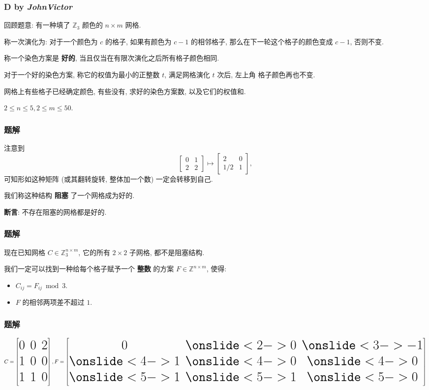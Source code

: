 \frame
{
    \frametitle{D {\Dname} {by \itshape JohnVictor}}

    回顾题意: 有一种填了 $\mathbb Z_3$ 颜色的 $n\times m$ 网格.

    称一次演化为: 对于一个颜色为 $c$ 的格子, 如果有颜色为 $c-1$ 的相邻格子,
    那么在下一轮这个格子的颜色变成 $c-1$, 否则不变.

    称一个染色方案是 \textbf{好的}, 当且仅当在有限次演化之后所有格子颜色相同.

    对于一个好的染色方案, 称它的权值为最小的正整数 $t$, 满足网格演化 $t$ 次后, 左上角
    格子颜色再也不变.

    网格上有些格子已经确定颜色, 有些没有, 求好的染色方案数, 以及它们的权值和.

    $2\leq n\leq 5, 2\leq m\leq 50$.
}

\frame
{
    \frametitle{题解}

    注意到
    \[ \begin{bmatrix}
        0 & 1\\
        2 & 2
    \end{bmatrix} \mapsto \begin{bmatrix}
        2 & 0\\
        1/2 & 1
    \end{bmatrix}, \]
    可知形如这种矩阵 (或其翻转旋转, 整体加一个数) 一定会转移到自己.

    \pause

    我们称这种结构 \textbf{阻塞} 了一个网格成为好的.

    \pause

    \textbf{断言}: 不存在阻塞的网格都是好的.
}

\frame
{
    \frametitle{题解}

    现在已知网格 $C\in \mathbb Z_3^{n\times m}$, 它的所有 $2\times 2$ 子网格, 都不是阻塞结构.

    我们一定可以找到一种给每个格子赋予一个 {\textbf{整数}} 的方案 $F\in \mathbb Z^{n\times m}$,
    使得:
    \begin{itemize}
        \item $C_{ij} = F_{ij} \bmod 3$.
        \item $F$ 的相邻两项差不超过 $1$.
    \end{itemize}
}

\frame
{
    \frametitle{题解}

    \[ \Huge {C = \begin{bmatrix}
        0 & 0 & 2\\
        1 & 0 & 0\\
        1 & 1 & 0
    \end{bmatrix}, F = \begin{bmatrix}
        0 & \onslide<2->{0} & \onslide<3->{-1} \\
        \onslide<4->{1} & \onslide<4->{0} & \onslide<4->{0} \\
        \onslide<5->{1} & \onslide<5->{1} & \onslide<5->{0}
    \end{bmatrix}} \]


}


